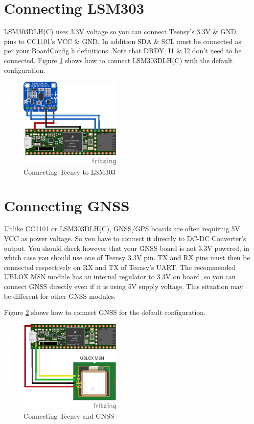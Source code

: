\documentclass{report}
\begin{document}
\section{Connecting LSM303}

LSM303DLH(C) uses 3.3V voltage so you can connect Teensy's 3.3V \& GND pins to CC1101's VCC \& GND. In addition SDA \& SCL must be connected as per your BoardConfig.h definitions. Note that DRDY, I1 \& I2 don't need to be connected. Figure \ref{figure:lsm303} shows how to connect LSM303DLH(C) with the default configuration.

\begin{figure}[h]
	\centering
	\includegraphics[width=50mm]{MicronetToNMEA_LSM303.png}
	\caption{Connecting Teensy to LSM303}
	\label{figure:lsm303}
\end{figure}

\section{Connecting GNSS}

Unlike CC1101 or LSM303DLH(C), GNSS/GPS boards are often requiring 5V VCC as power voltage. So you have to connect it directly to DC-DC Converter's output. You should check however that your GNSS board is not 3.3V powered, in which case you should use one of Teensy 3.3V pin.
TX and RX pins must then be connected respectively on RX and TX of Teensy's UART. The recommended UBLOX M8N module has an internal regulator to 3.3V on board, so you can connect GNSS directly even if it is using 5V supply voltage. This situation may be different for other GNSS modules. 

Figure \ref{figure:gnss} shows how to connect GNSS for the default configuration.

\begin{figure}[h]
	\centering
	\includegraphics[width=50mm]{MicronetToNMEA_GNSS.png}
	\caption{Connecting Teensy and GNSS}
	\label{figure:gnss}
\end{figure}
\end{document}
